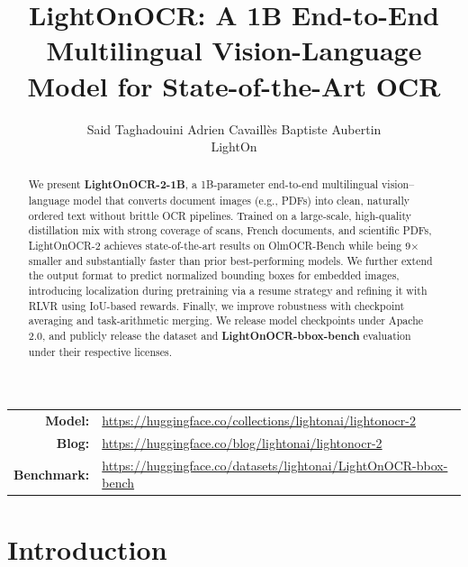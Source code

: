 \documentclass{article}
\title{LightOnOCR: A 1B End-to-End Multilingual Vision-Language Model for State-of-the-Art OCR
}
\author{
  Said Taghadouini \quad Adrien Cavaill\`es \quad Baptiste Aubertin \\
  LightOn
}
\begin{document}
\maketitle
\thispagestyle{empty}


\begin{abstract}
We present \textbf{LightOnOCR-2-1B}, a 1B-parameter end-to-end multilingual vision--language model that converts document images (e.g., PDFs) into clean, naturally ordered text without brittle OCR pipelines. Trained on a large-scale, high-quality distillation mix with strong coverage of scans, French documents, and scientific PDFs, LightOnOCR-2 achieves state-of-the-art results on OlmOCR-Bench while being 9$\times$ smaller and substantially faster than prior best-performing models. We further extend the output format to predict normalized bounding boxes for embedded images, introducing localization during pretraining via a resume strategy and refining it with RLVR using IoU-based rewards. Finally, we improve robustness with checkpoint averaging and task-arithmetic merging. We release model checkpoints under Apache 2.0, and publicly release the dataset and \textbf{LightOnOCR-bbox-bench} evaluation under their respective licenses.


\end{abstract}

\begin{center}
\setlength{\tabcolsep}{8pt}
\renewcommand{\arraystretch}{1.1}
\begin{tabular}{@{}rl@{}}
\textbf{Model:}  & \url{https://huggingface.co/collections/lightonai/lightonocr-2} \\
\textbf{Blog:}     & \url{https://huggingface.co/blog/lightonai/lightonocr-2} \\
\textbf{Benchmark:}     & \url{https://huggingface.co/datasets/lightonai/LightOnOCR-bbox-bench} \\
\end{tabular}
\end{center}




\section{Introduction}
\end{document}
